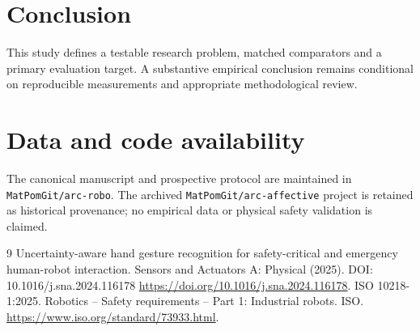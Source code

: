\documentclass[11pt,a4paper]{article}
\begin{document}
\section{Conclusion}
This study defines a testable research problem, matched comparators and a primary evaluation target. A substantive empirical conclusion remains conditional on reproducible measurements and appropriate methodological review.

\section{Data and code availability}
The canonical manuscript and prospective protocol are maintained in \texttt{MatPomGit/arc-robo}. The archived \texttt{MatPomGit/arc-affective} project is retained as historical provenance; no empirical data or physical safety validation is claimed.
\begin{thebibliography}{9}
 Uncertainty-aware hand gesture recognition for safety-critical and emergency human-robot interaction. Sensors and Actuators A: Physical (2025). DOI: 10.1016/j.sna.2024.116178 \url{https://doi.org/10.1016/j.sna.2024.116178}.
 ISO 10218-1:2025. Robotics -- Safety requirements -- Part 1: Industrial robots. ISO. \url{https://www.iso.org/standard/73933.html}.
\end{thebibliography}
\end{document}
